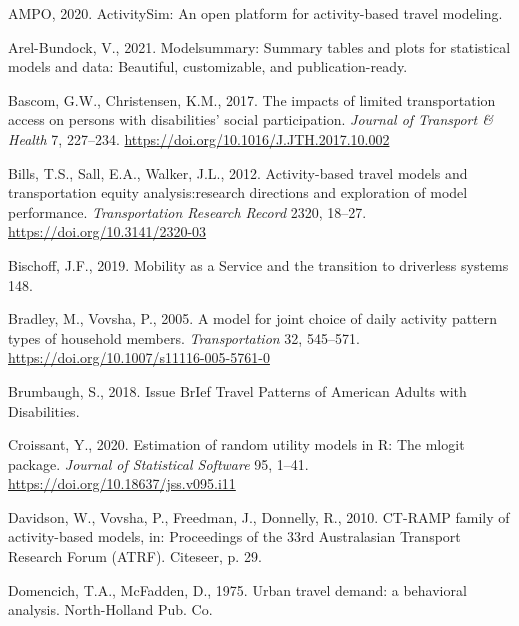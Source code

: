 \documentclass[3p, authoryear, review]{elsarticle} %
\newlength{\cslhangindent}
\newenvironment{CSLReferences}[2] %
 {%
  \setlength{\parindent}{0pt}
  \ifodd #1 \everypar{\setlength{\hangindent}{\cslhangindent}}\ignorespaces\fi
  \ifnum #2 > 0
  \setlength{\parskip}{#2\baselineskip}
  \fi
 }%
 {}
\begin{document}
\hypertarget{refs}{}
\begin{CSLReferences}{1}{0}
\leavevmode{}%
AMPO, 2020. ActivitySim: An open platform for activity-based travel modeling.

\leavevmode{}%
Arel-Bundock, V., 2021. Modelsummary: Summary tables and plots for statistical models and data: Beautiful, customizable, and publication-ready.

\leavevmode{}%
Bascom, G.W., Christensen, K.M., 2017. {The impacts of limited transportation access on persons with disabilities' social participation}. \emph{Journal of Transport {\&} Health} 7, 227--234. \url{https://doi.org/10.1016/J.JTH.2017.10.002}

\leavevmode{}%
Bills, T.S., Sall, E.A., Walker, J.L., 2012. Activity-based travel models and transportation equity analysis:research directions and exploration of model performance. \emph{Transportation Research Record} 2320, 18--27. \url{https://doi.org/10.3141/2320-03}

\leavevmode{}%
Bischoff, J.F., 2019. {Mobility as a Service and the transition to driverless systems} 148.

\leavevmode{}%
Bradley, M., Vovsha, P., 2005. {A model for joint choice of daily activity pattern types of household members}. \emph{Transportation} 32, 545--571. \url{https://doi.org/10.1007/s11116-005-5761-0}

\leavevmode{}%
Brumbaugh, S., 2018. {Issue BrIef Travel Patterns of American Adults with Disabilities}.

\leavevmode{}%
Croissant, Y., 2020. Estimation of random utility models in {R}: The {mlogit} package. \emph{Journal of Statistical Software} 95, 1--41. \url{https://doi.org/10.18637/jss.v095.i11}

\leavevmode{}%
Davidson, W., Vovsha, P., Freedman, J., Donnelly, R., 2010. CT-RAMP family of activity-based models, in: Proceedings of the 33rd Australasian Transport Research Forum (ATRF). Citeseer, p. 29.

\leavevmode{}%
Domencich, T.A., McFadden, D., 1975. {Urban travel demand: a behavioral analysis}. North-Holland Pub. Co.


\end{CSLReferences}
\end{document}

